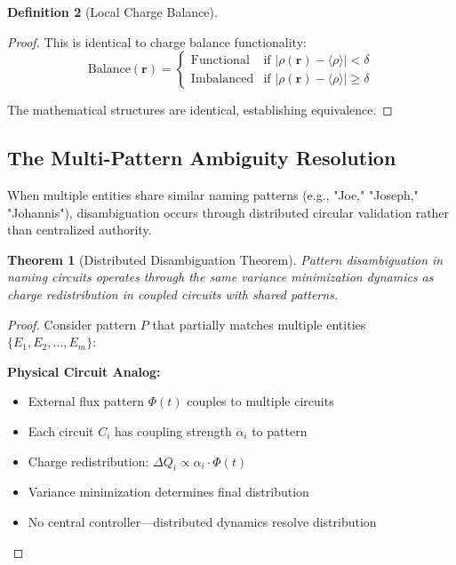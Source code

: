 \documentclass[12pt,a4paper]{article}
\theoremstyle{plain}
\newtheorem{theorem}{Theorem}[section]
\theoremstyle{definition}
\newtheorem{definition}[theorem]{Definition}
\theoremstyle{remark}
\begin{document}
\begin{definition}[Local Charge Balance]
\begin{proof}
This is identical to charge balance functionality:
\begin{equation}
\text{Balance}(\mathbf{r}) = \begin{cases}
\text{Functional} & \text{if } |\rho(\mathbf{r}) - \langle \rho \rangle| < \delta \\
\text{Imbalanced} & \text{if } |\rho(\mathbf{r}) - \langle \rho \rangle| \geq \delta
\end{cases}
\end{equation}

The mathematical structures are identical, establishing equivalence.
\end{proof}

\subsection{The Multi-Pattern Ambiguity Resolution}

\begin{observation}
When multiple entities share similar naming patterns (e.g., "Joe," "Joseph," "Johannis"), disambiguation occurs through distributed circular validation rather than centralized authority.
\end{observation}

\begin{theorem}[Distributed Disambiguation Theorem]
Pattern disambiguation in naming circuits operates through the same variance minimization dynamics as charge redistribution in coupled circuits with shared patterns.
\end{theorem}

\begin{proof}
Consider pattern $P$ that partially matches multiple entities $\{E_1, E_2, \ldots, E_m\}$:

\textbf{Physical Circuit Analog:}
\begin{itemize}
\item External flux pattern $\Phi(t)$ couples to multiple circuits
\item Each circuit $C_i$ has coupling strength $\alpha_i$ to pattern
\item Charge redistribution: $\Delta Q_i \propto \alpha_i \cdot \Phi(t)$
\item Variance minimization determines final distribution
\item No central controller—distributed dynamics resolve distribution
\end{itemize}


\end{proof}
\end{definition}
\end{document}
